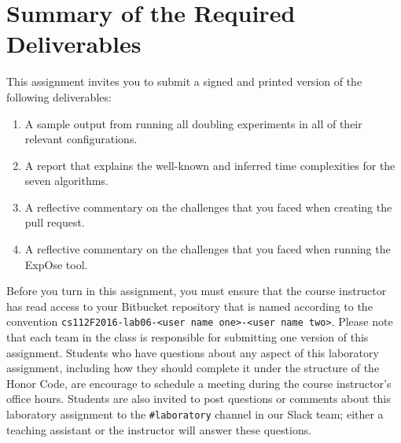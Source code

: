 \section*{Summary of the Required Deliverables}

This assignment invites you to submit a signed and printed version of the following deliverables:

\begin{enumerate}

  \itemsep0in

  \item A sample output from running all doubling experiments in all of their relevant configurations.

  \item A report that explains the well-known and inferred time complexities for the seven algorithms.

  \item A reflective commentary on the challenges that you faced when creating the pull request.

  \item A reflective commentary on the challenges that you faced when running the {\sc ExpOse} tool.


\end{enumerate}

Before you turn in this assignment, you must ensure that the course instructor has read access to your Bitbucket
repository that is named according to the convention {\tt cs112F2016-lab06-<user name one>-<user name two>}. Please note
that each team in the class is responsible for submitting one version of this assignment. Students who have questions
about any aspect of this laboratory assignment, including how they should complete it under the structure of the Honor
Code, are encourage to schedule a meeting during the course instructor's office hours. Students are also invited to
post questions or comments about this laboratory assignment to the {\tt \#laboratory} channel in our Slack team; either
a teaching assistant or the instructor will answer these questions.


